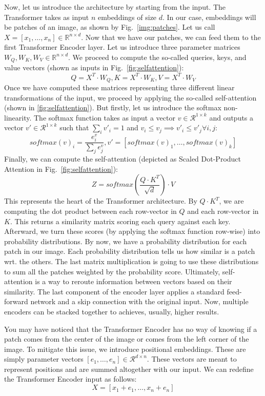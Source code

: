 Now, let us introduce the architecture by starting from the input. The Transformer takes as input $n$ embeddings of size $d$. In our case, embeddings will be patches of an image, as shown by Fig.~\ref{img:patches}. Let us call $X = [x_1, \dots, x_n] \in \mathbb{R}^{n\times d}$. Now that we have our patches, we can feed them to the first Transformer Encoder layer. Let us introduce three parameter matrices $W_Q, W_K, W_V \in \mathbb{R}^{n\times d}$. We proceed to compute the so-called queries, keys, and value vectors (shown as inputs in Fig.~\ref{fig:selfattention}):
\[Q = X^T\cdot W_Q, K = X^T\cdot W_K, V = X^T\cdot W_V\]
Once we have computed these matrices representing three different linear transformations of the input, we proceed by applying the so-called self-attention (shown in \ref{fig:selfattention}). But firstly, let us introduce the softmax non-linearity. The softmax function takes as input a vector $v \in \mathcal{R}^{1\times k}$ and outputs a vector $v' \in \mathcal{R}^{1\times k}$ such that $\sum_i v'_i = 1$ and $v_i \leq v_j \implies v'_i \leq v'_j \forall i,j$:
\[softmax(v)_i = \frac{e^v_i}{\sum_j{e^v_j}}, v'=[softmax(v)_1,\dots,softmax(v)_k]\]
Finally, we can compute the self-attention (depicted as Scaled Dot-Product Attention in Fig.~\ref{fig:selfattention}):
\[Z = softmax(\frac{Q\cdot K^T}{\sqrt{d}})\cdot V\]
This represents the heart of the Transformer architecture. By $Q \cdot K^T$, we are computing the dot product between each row-vector in $Q$ and each row-vector in $K$. This returns a similarity matrix scoring each query against each key. Afterward, we turn these scores (by applying the softmax function row-wise) into probability distributions. By now, we have a probability distribution for each patch in our image. Each probability distribution tells us how similar is a patch wrt. the others. The last matrix multiplication is going to use these distributions to sum all the patches weighted by the probability score. Ultimately, self-attention is a way to reroute information between vectors based on their similarity.
The last component of the encoder layer applies a standard feed-forward network and a skip connection with the original input. Now, multiple encoders can be stacked together to achieves, usually, higher results.

You may have noticed that the Transformer Encoder has no way of knowing if a patch comes from the center of the image or comes from the left corner of the image. To mitigate this issue, we introduce positional embeddings. These are simply parameter vectors $[e_1, \dots, e_n]\in\mathcal{R}^{d\times n}$. These vectors are meant to represent positions and are summed altogether with our input. We can redefine the Transformer Encoder input as follows:
\[X = [x_1+e_1,\dots,x_n+e_n]\]

